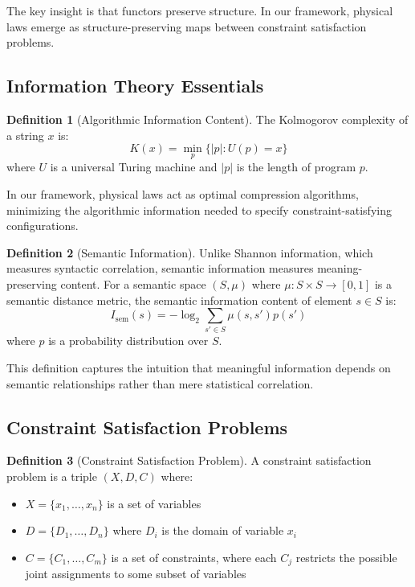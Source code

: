 \documentclass[11pt]{article}
\theoremstyle{definition}
\newtheorem{definition}{Definition}[section]
\begin{document}
The key insight is that functors preserve structure. In our framework, physical laws emerge as structure-preserving maps between constraint satisfaction problems.

\subsection{Information Theory Essentials}

\begin{definition}[Algorithmic Information Content]
The Kolmogorov complexity of a string $x$ is:
\begin{equation}
K(x) = \min_{p}\{|p| : U(p) = x\}
\end{equation}
where $U$ is a universal Turing machine and $|p|$ is the length of program $p$.
\end{definition}

In our framework, physical laws act as optimal compression algorithms, minimizing the algorithmic information needed to specify constraint-satisfying configurations.

\begin{definition}[Semantic Information]
Unlike Shannon information, which measures syntactic correlation, semantic information measures meaning-preserving content. For a semantic space $(S, \mu)$ where $\mu: S \times S \to [0,1]$ is a semantic distance metric, the semantic information content of element $s \in S$ is:
\begin{equation}
I_{\text{sem}}(s) = -\log_2 \sum_{s' \in S} \mu(s, s') p(s')
\end{equation}
where $p$ is a probability distribution over $S$.
\end{definition}

This definition captures the intuition that meaningful information depends on semantic relationships rather than mere statistical correlation.

\subsection{Constraint Satisfaction Problems}

\begin{definition}[Constraint Satisfaction Problem]
A constraint satisfaction problem is a triple $(X, D, C)$ where:
\begin{itemize}
\item $X = \{x_1, \ldots, x_n\}$ is a set of variables
\item $D = \{D_1, \ldots, D_n\}$ where $D_i$ is the domain of variable $x_i$
\item $C = \{C_1, \ldots, C_m\}$ is a set of constraints, where each $C_j$ restricts the possible joint assignments to some subset of variables
\end{itemize}
\end{definition}
\end{document}
